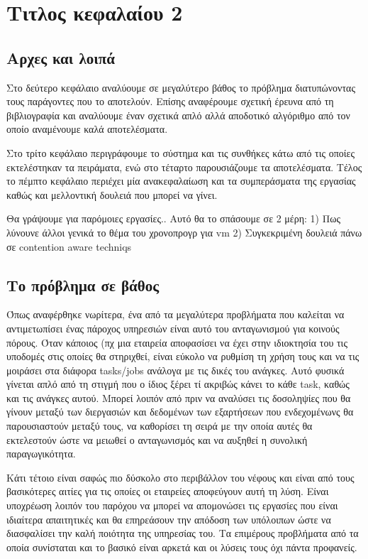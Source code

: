 \chapter{Τιτλος κεφαλαίου 2}
\section{Αρχες και λοιπά}
Στο δεύτερο κεφάλαιο αναλύουμε σε μεγαλύτερο βάθος το πρόβλημα διατυπώνοντας
τους παράγοντες που το αποτελούν. Επίσης αναφέρουμε σχετική έρευνα από τη
βιβλιογραφία και αναλύουμε έναν σχετικά απλό αλλά αποδοτικό αλγόριθμο από τον
οποίο αναμένουμε καλά αποτελέσματα.

Στο τρίτο κεφάλαιο περιγράφουμε το σύστημα και τις συνθήκες κάτω από τις οποίες
εκτελέστηκαν τα πειράματα, ενώ στο τέταρτο παρουσιάζουμε τα αποτελέσματα. Τέλος
το πέμπτο κεφάλαιο περιέχει μία ανακεφαλαίωση και τα συμπεράσματα της εργασίας
καθώς και μελλοντική δουλειά που μπορεί να γίνει.

Θα γράψουμε για παρόμοιες εργασίες.. Αυτό θα το σπάσουμε σε 2 μέρη:
1) Πως λύνουνε άλλοι γενικά το θέμα του χρονοπρογρ για vm
2) Συγκεκριμένη δουλειά πάνω σε contention aware techniqs
\section{Το πρόβλημα σε βάθος}
Όπως αναφέρθηκε νωρίτερα, ένα από τα μεγαλύτερα προβλήματα που καλείται να
αντιμετωπίσει ένας πάροχος υπηρεσιών είναι αυτό του ανταγωνισμού για κοινούς
πόρους. Όταν κάποιος (πχ μια εταιρεία αποφασίσει να έχει στην ιδιοκτησία του τις
υποδομές στις οποίες θα στηριχθεί, είναι εύκολο να ρυθμίση τη χρήση τους και να
τις μοιράσει στα διάφορα tasks/jobs ανάλογα με τις δικές του ανάγκες. Αυτό
φυσικά γίνεται απλό από τη στιγμή που ο ίδιος ξέρει τί ακριβώς κάνει το κάθε
task, καθώς και τις ανάγκες αυτού. Μπορεί λοιπόν από πριν να αναλύσει τις
δοσοληψίες που θα γίνουν μεταξύ των διεργασιών και δεδομένων των εξαρτήσεων που
ενδεχομένωνς θα παρουσιαστούν μεταξύ τους, να καθορίσει τη σειρά με την οποία
αυτές θα εκτελεστούν ώστε να μειωθεί ο ανταγωνισμός και να αυξηθεί η
συνολική παραγωγικότητα.

Κάτι τέτοιο είναι σαφώς πιο δύσκολο στο περιβάλλον του νέφους και είναι από τους
βασικότερες αιτίες για τις οποίες οι εταιρείες αποφεύγουν αυτή τη λύση. Είναι
υποχρέωση λοιπόν του παρόχου να μπορεί να απομονώσει τις εργασίες που είναι
ιδιαίτερα απαιτητικές και θα επηρεάσουν την απόδοση των υπόλοιπων ώστε να
διασφαλίσει την καλή ποιότητα της υπηρεσίας του. Τα επιμέρους προβλήματα από τα
οποία συνίσταται και το βασικό είναι αρκετά και οι λύσεις τους όχι πάντα
προφανείς.

